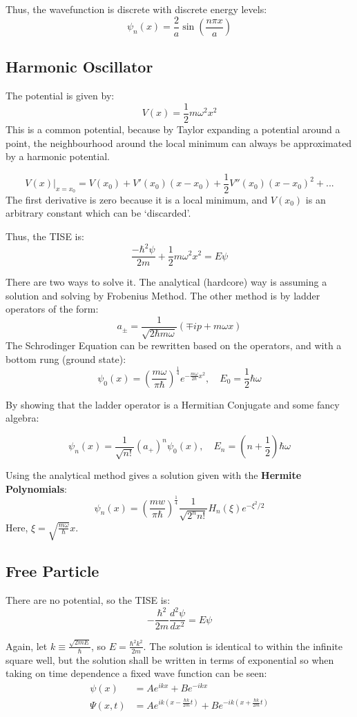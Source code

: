 \documentclass[12pt]{article}
\begin{document}
Thus, the wavefunction is discrete with discrete energy levels:
\[\boxed{\psi_n(x) = \frac{2}{a}\sin\left({\frac{n\pi x}{a}}\right)}\]


\subsection{Harmonic Oscillator}
The potential is given by:
\[ V(x) = \frac12 m\omega^2x^2\]
This is a common potential, because by Taylor expanding a potential around a point, the neighbourhood around the local minimum can always be approximated by a harmonic potential. 

\[V(x)|_{x=x_0} = V(x_0) + V'(x_0)(x-x_0) + \frac12 V''(x_0)(x-x_0)^2 + ...\]
The first derivative is zero because it is a local minimum, and $V(x_0)$ is an arbitrary constant which can be `discarded'.

Thus, the TISE is:
\[\frac{-\hbar^2\psi}{2m} + \frac12 m\omega^2x^2 = E\psi\]

There are two ways to solve it. The analytical (hardcore) way is assuming a solution and solving by Frobenius Method. The other method is by ladder operators of the form:
\[\boxed{a_\pm = \frac{1}{\sqrt{2\hbar m \omega}}\left(\mp ip + m\omega x\right)}\]
The Schrodinger Equation can be rewritten based on the operators, and with a bottom rung (ground state):
\[\psi_0(x) = (\frac{m\omega}{\pi\hbar})^\frac14 e^{-\frac{m\omega}{2\hbar}x^2}, \quad E_0 = \frac12 \hbar \omega \]

By showing that the ladder operator is a Hermitian Conjugate and some fancy algebra:

\[\boxed{\psi_n(x) = \frac{1}{\sqrt{n!}} (a_+)^n \psi_0(x), \quad E_n = \left(n+\frac12\right) \hbar \omega}\]

Using the analytical method gives a solution given with the \textbf{Hermite Polynomials}:
\[\boxed{\psi_n(x) = \left(\frac{mw}{\pi\hbar}\right)^{\frac14}\frac{1}{\sqrt{2^nn!}}H_n(\xi)e^{-\xi^2/2}}\]
Here, $\xi = \sqrt{\frac{m\omega}{\hbar}}x$.

\subsection{Free Particle}
There are no potential, so the TISE is:
\[ -\frac{\hbar^2}{2m} \frac{d^2\psi}{dx^2} = E\psi\]

Again, let $k \equiv \frac{\sqrt{2mE}}{\hbar}$, so $E = \frac{\hbar^2k^2}{2m}$. The solution is identical to within the infinite square well, but the solution shall be written in terms of exponential so when taking on time dependence a fixed wave function can be seen:
\begin{align*}
    \psi(x) &= Ae^{ikx} + Be^{-ikx}\\
    \Psi(x,t) &= Ae^{ik(x - \frac{\hbar k}{2m}t)} + Be^{-ik(x + \frac{\hbar k}{2m} t)}
\end{align*}
\end{document}

